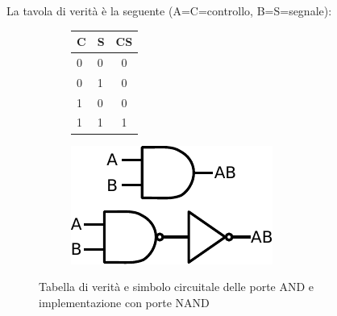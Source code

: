 
La tavola di verità è la seguente (A=C=controllo, B=S=segnale):

\begin{figure}[htpc]
\centering
	\begin{subfigure}[hc]{.4\textwidth}
		\centering
		{\renewcommand{\arraystretch}{1.1}%
		\begin{tabular}{|l|l|c|}
		\hline
		C & S & CS \\
		\hline
		0 & 0 & 0\\
		\hline
		0 & 1 & 0\\
		\hline
		1 & 0 & 0\\
		\hline
		1 & 1 & 1\\
		\hline
		\end{tabular}}
		\label{tab9:AND}
        \end{subfigure}
        \begin{subfigure}[hc]{.4\textwidth}
		\centering
		\includegraphics[width=.5\textwidth]{../E09/latex/AND.pdf}
		\label{cir9:AND}
        \end{subfigure}
\caption{Tabella di verità e simbolo circuitale delle porte AND e implementazione con porte NAND}
\end{figure}


